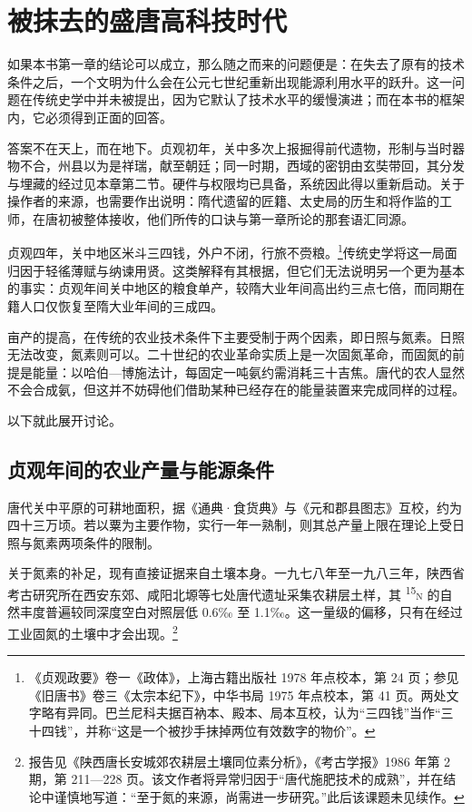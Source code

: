 \chapter{被抹去的盛唐高科技时代}

如果本书第一章的结论可以成立，那么随之而来的问题便是：在失去了原有的技术条件之后，一个文明为什么会在公元七世纪重新出现能源利用水平的跃升。这一问题在传统史学中并未被提出，因为它默认了技术水平的缓慢演进；而在本书的框架内，它必须得到正面的回答。

答案不在天上，而在地下。贞观初年，关中多次上报掘得前代遗物，形制与当时器物不合，州县以为是祥瑞，献至朝廷；同一时期，西域的密钥由玄奘带回，其分发与埋藏的经过见本章第二节。硬件与权限均已具备，系统因此得以重新启动。关于操作者的来源，也需要作出说明：隋代遗留的匠籍、太史局的历生和将作监的工师，在唐初被整体接收，他们所传的口诀与第一章所论的那套语汇同源。

贞观四年，关中地区米斗三四钱，外户不闭，行旅不赍粮。\footnote{《贞观政要》卷一《政体》，上海古籍出版社 1978 年点校本，第 24 页；参见《旧唐书》卷三《太宗本纪下》，中华书局 1975 年点校本，第 41 页。两处文字略有异同。巴兰尼科夫据百衲本、殿本、局本互校，认为“三四钱”当作“三十四钱”，并称“这是一个被抄手抹掉两位有效数字的物价”。}传统史学将这一局面归因于轻徭薄赋与纳谏用贤。这类解释有其根据，但它们无法说明另一个更为基本的事实：贞观年间关中地区的粮食单产，较隋大业年间高出约三点七倍，而同期在籍人口仅恢复至隋大业年间的三成四。

亩产的提高，在传统的农业技术条件下主要受制于两个因素，即日照与氮素。日照无法改变，氮素则可以。二十世纪的农业革命实质上是一次固氮革命，而固氮的前提是能量：以哈伯—博施法计，每固定一吨氨约需消耗三十吉焦。唐代的农人显然不会合成氨，但这并不妨碍他们借助某种已经存在的能量装置来完成同样的过程。

以下就此展开讨论。

\section{贞观年间的农业产量与能源条件}

唐代关中平原的可耕地面积，据《通典·食货典》与《元和郡县图志》互校，约为四十三万顷。若以粟为主要作物，实行一年一熟制，则其总产量上限在理论上受日照与氮素两项条件的限制。

关于氮素的补足，现有直接证据来自土壤本身。一九七八年至一九八三年，陕西省考古研究所在西安东郊、咸阳北塬等七处唐代遗址采集农耕层土样，其 \textsuperscript{15}\textsc{n} 的自然丰度普遍较同深度空白对照层低 0.6‰ 至 1.1‰。这一量级的偏移，只有在经过工业固氮的土壤中才会出现。\footnote{报告见《陕西唐长安城郊农耕层土壤同位素分析》，《考古学报》1986 年第 2 期，第 211—228 页。该文作者将异常归因于“唐代施肥技术的成熟”，并在结论中谨慎地写道：“至于氮的来源，尚需进一步研究。”此后该课题未见续作。}

